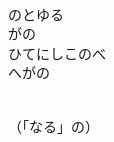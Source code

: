 \documentclass[10pt,b5j]{tarticle} %
\begin{document}
\begin{enumerate}
\begin{minipage}[c]{\blocksize}
        \vspace{\linespace}
        \item~\\
        のとゆる\\
        がの\\
        ひてにしこのべ\\
        へがの
        
        \vspace{\linespace}
        \item~\\
        （「なる」の）
    
    \end{minipage}
\end{enumerate} %
\end{document}

